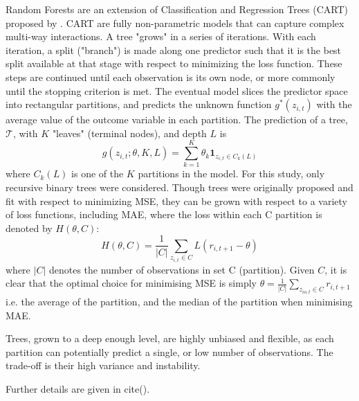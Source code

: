 \documentclass{article}
\begin{document}
Random Forests are an extension of Classification and Regression Trees (CART) proposed by \cite{breiman_random_2001}. CART are fully non-parametric models that can capture complex multi-way interactions. A tree "grows" in a series of iterations. With each iteration, a split ("branch") is made along one predictor such that it is the best split available at that stage with respect to minimizing the loss function. These steps are continued until each observation is its own node, or more commonly until the stopping criterion is met. The eventual model slices the predictor space into rectangular partitions, and predicts the unknown function $g^*(z_{i,t})$ with the average value of the outcome variable in each partition. The prediction of a tree, $\mathcal{T}$, with \(K\) "leaves" (terminal nodes), and depth $L$ is
\begin{equation}
g(z_{i,t};\theta,K,L) = \sum_{k=1}^{K}\theta_k\textbf{1}_{z_{i,t}\in C_k(L)}
\end{equation}
where $C_k(L)$ is one of the $K$ partitions in the model. For this study, only recursive binary trees were considered. Though trees were originally proposed and fit with respect to minimizing MSE, they can be grown with respect to a variety of loss functions, including MAE, where the loss within each C partition is denoted by $H(\theta, C)$: 
\begin{equation}
H(\theta, C) = \frac{1}{|C|} \sum_{z_{i,t} \in C} L(r_{i,t+1} - \theta)
\end{equation} 
where $|C|$ denotes the number of observations in set C (partition). Given $C$, it is clear that the optimal choice for minimising MSE is simply $\theta = \frac{1}{|C|} \sum_{z_{io,t}\in C}^{ }r_{i,t+1}$ i.e. the average of the partition, and the median of the partition when minimising MAE.

Trees, grown to a deep enough level, are highly unbiased and flexible, as each partition can potentially predict a single, or low number of observations. The trade-off is their high variance and instability. 

Further details are given in cite().
\end{document}
